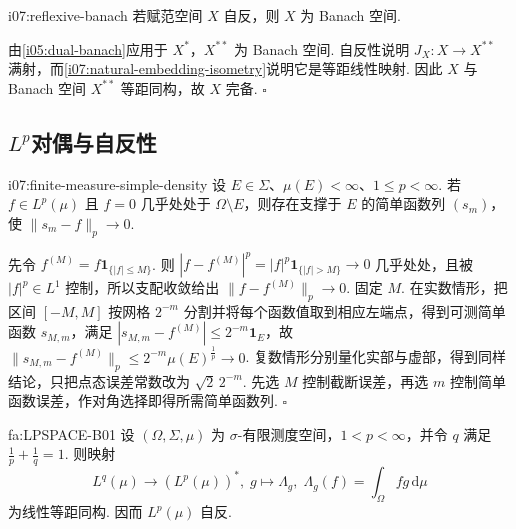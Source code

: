 \begin{FACorollary}[B][自反赋范空间自动完备]{i07:reflexive-banach}
若赋范空间 \(\displaystyle X\) 自反，则 \(\displaystyle X\) 为 Banach 空间.
\end{FACorollary}

\begin{FAProof}
由\autoref{i05:dual-banach}应用于 \(\displaystyle X^*\)，\(\displaystyle X^{**}\) 为 Banach 空间. 自反性说明 \(\displaystyle J_X:X\to X^{**}\) 满射，而\autoref{i07:natural-embedding-isometry}说明它是等距线性映射. 因此 \(\displaystyle X\) 与 Banach 空间 \(\displaystyle X^{**}\) 等距同构，故 \(\displaystyle X\) 完备.
\hfill\(\square\)
\end{FAProof}

\subsection{\texorpdfstring{\(\displaystyle L^p\)}{Lp}对偶与自反性}

\begin{FALemma}[C][有限测度集上的简单函数逼近]{i07:finite-measure-simple-density}
设 \(\displaystyle E\in\Sigma\)、\(\displaystyle \mu(E)<\infty\)、\(\displaystyle 1\leqslant p<\infty\). 若 \(\displaystyle f\in L^p(\mu)\) 且 \(\displaystyle f=0\) 几乎处处于 \(\displaystyle \Omega\setminus E\)，则存在支撑于 \(\displaystyle E\) 的简单函数列 \(\displaystyle (s_m)\)，使 \(\displaystyle \|s_m-f\|_p\to0\).
\end{FALemma}

\begin{FAProof}
先令 \(\displaystyle f^{(M)}=f\mathbf1_{\{|f|\leqslant M\}}\). 则 \(\displaystyle |f-f^{(M)}|^p=|f|^p\mathbf1_{\{|f|>M\}}\to0\) 几乎处处，且被 \(\displaystyle |f|^p\in L^1\) 控制，所以支配收敛给出 \(\displaystyle \|f-f^{(M)}\|_p\to0\). 固定 \(\displaystyle M\). 在实数情形，把区间 \(\displaystyle [-M,M]\) 按网格 \(\displaystyle 2^{-m}\) 分割并将每个函数值取到相应左端点，得到可测简单函数 \(\displaystyle s_{M,m}\)，满足 \(\displaystyle |s_{M,m}-f^{(M)}|\leqslant2^{-m}\mathbf1_E\)，故 \(\displaystyle \|s_{M,m}-f^{(M)}\|_p\leqslant2^{-m}\mu(E)^{\frac{1}{p}}\to0\). 复数情形分别量化实部与虚部，得到同样结论，只把点态误差常数改为 \(\displaystyle \sqrt2\,2^{-m}\). 先选 \(\displaystyle M\) 控制截断误差，再选 \(\displaystyle m\) 控制简单函数误差，作对角选择即得所需简单函数列.
\hfill\(\square\)
\end{FAProof}

\begin{FATheorem}{fa:LPSPACE-B01}
设 \(\displaystyle (\Omega,\Sigma,\mu)\) 为 \(\displaystyle \sigma\)-有限测度空间，\(\displaystyle 1<p<\infty\)，并令 \(\displaystyle q\) 满足 \(\displaystyle \frac{1}{p}+\frac{1}{q}=1\). 则映射
\[
L^q(\mu)\longrightarrow(L^p(\mu))^*,
\;
g\longmapsto\Lambda_g,
\;
\Lambda_g(f)=\int_\Omega fg\,\mathrm{d}\mu
\]
为线性等距同构. 因而 \(\displaystyle L^p(\mu)\) 自反.
\end{FATheorem}

